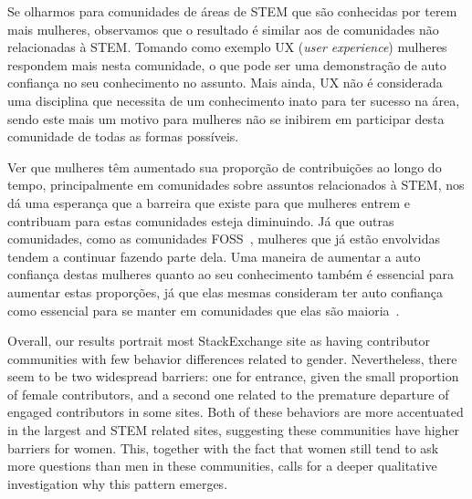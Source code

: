 Se olharmos para comunidades de áreas de STEM que são conhecidas por terem mais mulheres, observamos que o resultado é similar aos de comunidades não relacionadas à STEM. Tomando como exemplo UX (\textit{user experience}) mulheres respondem mais nesta comunidade, o que pode ser uma demonstração de auto confiança no seu conhecimento no assunto. Mais ainda, UX não é considerada uma disciplina que necessita de um conhecimento inato para ter sucesso na área, sendo este mais um motivo para mulheres não se inibirem em participar desta comunidade de todas as formas possíveis. 

Ver que mulheres têm aumentado sua proporção de contribuições ao longo do tempo, principalmente em comunidades sobre assuntos relacionados à STEM, nos dá uma esperança que a barreira que existe para que mulheres entrem e contribuam para estas comunidades esteja diminuindo. Já que outras comunidades, como as comunidades FOSS~\cite{powell2010gender}, mulheres que já estão envolvidas tendem a continuar fazendo parte dela. Uma maneira de aumentar a auto confiança destas mulheres quanto ao seu conhecimento também é essencial para aumentar estas proporções, já que elas mesmas consideram ter auto confiança como essencial para se manter em comunidades que elas são maioria~\cite{powell2010gender}.

Overall, our results portrait most StackExchange site as having contributor communities with few behavior differences related to gender. Nevertheless, there seem to be two widespread barriers: one for entrance, given the small proportion of female contributors, and a second one related to the premature departure of engaged contributors in some sites. Both of these behaviors are more accentuated in the largest and STEM related sites, suggesting these communities have higher barriers for women. This, together with the fact that women still tend to ask more questions than men in these communities, calls for a deeper qualitative investigation why this pattern emerges.





